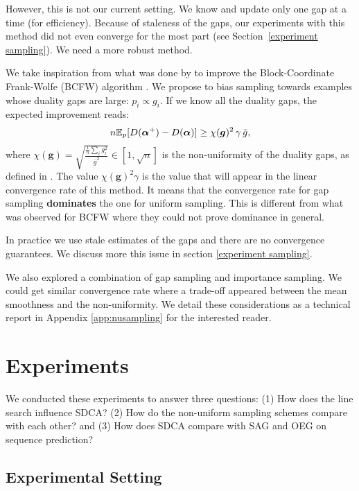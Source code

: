 However, this is not our current setting.
We know and update only one gap at a time (for efficiency).
Because of staleness of the gaps, our experiments with this method did not even converge for the most part (see Section~\ref{experiment sampling}).
We need a more robust method.

We take inspiration from what was done by \citet{osokin2016minding} to improve the Block-Coordinate Frank-Wolfe (BCFW) algorithm \citep{lacoste2013block}.
We propose to bias sampling towards examples whose duality gaps are large: $p_i \propto g_i$.
If we know all the duality gaps, the expected improvement reads:
\begin{equation}
	n \mathbb E_p[D(\boldsymbol{\alpha}^+) - D(\boldsymbol{\alpha})]
		\geq \chi(\bm g)^2 \, \gamma \, \bar g,
\end{equation}
where $	\chi(\bm g) = \sqrt{ \frac{ \frac{1}{n} \sum_i g_i^2}{\bar g^2} } \in [1, \sqrt n] $ is the non-uniformity of the duality gaps, as defined in \citet[Section 3.1]{osokin2016minding}.
The value $\chi(\bm g)^2 \gamma$ is the value that will appear in the linear convergence rate of this method.
It means that the convergence rate for gap sampling \textbf{dominates} the one for uniform sampling.
This is different from what was observed for  BCFW where they could not prove dominance in general.

In practice we use stale estimates of the gaps and there are no convergence guarantees.
We discuss more this issue in section \ref{experiment sampling}.

We also explored a combination of gap sampling and importance sampling.
We could get similar convergence rate where a trade-off appeared between the mean smoothness and the non-uniformity.
We detail these considerations as a technical report in Appendix \ref{app:nusampling} for the interested reader.

\section{Experiments} \label{sec:experiments}
We conducted these experiments to answer three questions:
(1) How does the line search influence SDCA?
(2) How do the non-uniform sampling schemes compare with each other?
and (3) How does SDCA compare with SAG and OEG on sequence prediction?

\subsection{Experimental Setting}

